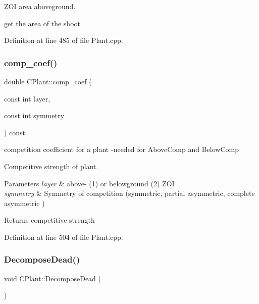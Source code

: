 Z\+OI area aboveground. 

get the area of the shoot 

Definition at line 485 of file Plant.\+cpp.

\mbox{\label{class_c_plant_aa9b9a4a1be9df4e507144ba3bfde8f50}} 
\subsubsection{\texorpdfstring{comp\_coef()}{comp\_coef()}}
{\footnotesize\ttfamily double C\+Plant\+::comp\+\_\+coef (\begin{DoxyParamCaption}\item[{const int}]{layer,  }\item[{const int}]{symmetry }\end{DoxyParamCaption}) const}



competition coefficient for a plant -\/needed for Above\+Comp and Below\+Comp 

Competitive strength of plant. 
\begin{DoxyParams}{Parameters}
{\em layer} & above-\/ (1) or belowground (2) Z\+OI \\
\hline
{\em symmetry} & Symmetry of competition (symmetric, partial asymmetric, complete asymmetric )\\
\hline
\end{DoxyParams}
\begin{DoxyReturn}{Returns}
competitive strength 
\end{DoxyReturn}


Definition at line 504 of file Plant.\+cpp.

\mbox{\label{class_c_plant_a85a5028cbe8028f6c5222f2d32fb21da}} 
\subsubsection{\texorpdfstring{DecomposeDead()}{DecomposeDead()}}
{\footnotesize\ttfamily void C\+Plant\+::\+Decompose\+Dead (\begin{DoxyParamCaption}{ }\end{DoxyParamCaption})}



